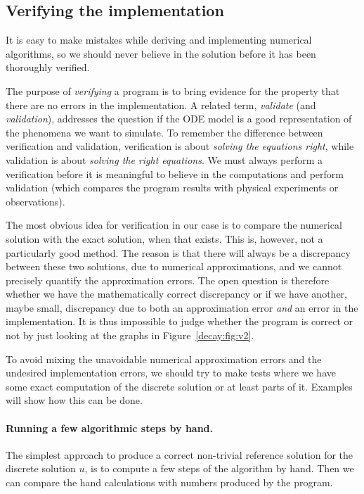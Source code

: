 \documentclass[%
oneside,                 %
final,                   %
10pt]{article}
\newenvironment{notice_mdfboxadmon}[1][]{
\begin{notice_mdfboxmdframed}[frametitle=#1]
}
{
\end{notice_mdfboxmdframed}
}
\begin{document}
\subsection{Verifying the implementation}

It is easy to make mistakes while deriving and implementing numerical
algorithms, so we should never believe in the solution before it has
been thoroughly verified.


\begin{notice_mdfboxadmon}
The purpose of \emph{verifying} a program is to bring evidence for the
property that there are no errors in the implementation. A related
term, \emph{validate} (and \emph{validation}),
addresses the question if the ODE model is a good
representation of the phenomena we want to simulate. To remember the
difference between verification and validation, verification is
about \emph{solving the equations right}, while validation is about \emph{solving
the right equations}. We must always perform a verification before
it is meaningful to believe in the computations and perform validation
(which compares the program results with physical experiments or observations).
\end{notice_mdfboxadmon}




The most obvious idea for verification
in our case is to compare the numerical solution with the exact
solution, when that exists. This is, however, not a particularly good
method. The reason is that there will always
be a discrepancy
between these two solutions, due to numerical
approximations, and we cannot precisely quantify the approximation
errors. The open question is therefore whether we have the
mathematically correct
discrepancy or if we have another, maybe small,
discrepancy due to both an approximation error \emph{and} an error in the
implementation. It is thus
impossible to judge whether the program is correct or not by
just looking at the graphs in Figure~\ref{decay:fig:v2}.

To avoid
mixing the unavoidable numerical approximation errors and the
undesired implementation errors, we should try to make tests where
we have some exact
computation of the discrete solution or at least parts of it.
Examples will show how this can be done.

\paragraph{Running a few algorithmic steps by hand.}
The simplest approach to produce a correct non-trivial reference
solution for the discrete solution $u$, is to compute a few steps of
the algorithm by hand. Then we can compare the hand calculations with
numbers produced by the program.
\end{document}
